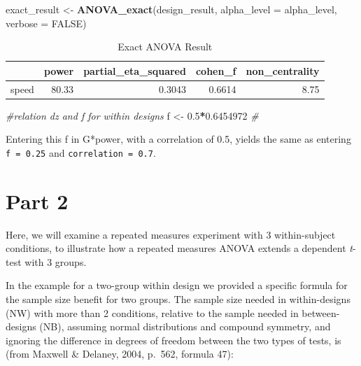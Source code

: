 \documentclass[]{book}
\newenvironment{Shaded}{\begin{snugshade}}{\end{snugshade}}
\newcommand{\CommentTok}[1]{\textcolor[rgb]{0.56,0.35,0.01}{\textit{#1}}}
\newcommand{\DataTypeTok}[1]{\textcolor[rgb]{0.13,0.29,0.53}{#1}}
\newcommand{\FloatTok}[1]{\textcolor[rgb]{0.00,0.00,0.81}{#1}}
\newcommand{\KeywordTok}[1]{\textcolor[rgb]{0.13,0.29,0.53}{\textbf{#1}}}
\newcommand{\NormalTok}[1]{#1}
\newcommand{\OperatorTok}[1]{\textcolor[rgb]{0.81,0.36,0.00}{\textbf{#1}}}
\newcommand{\OtherTok}[1]{\textcolor[rgb]{0.56,0.35,0.01}{#1}}
\newcommand{\StringTok}[1]{\textcolor[rgb]{0.31,0.60,0.02}{#1}}
\begin{document}
\begin{Shaded}
\begin{Highlighting}[]
\NormalTok{exact_result <-}\StringTok{ }\KeywordTok{ANOVA_exact}\NormalTok{(design_result,}
                            \DataTypeTok{alpha_level =}\NormalTok{ alpha_level,}
                            \DataTypeTok{verbose =} \OtherTok{FALSE}\NormalTok{)}
\end{Highlighting}
\end{Shaded}

\begin{table}[!h]

\caption{\label{tab:unnamed-chunk-105}Exact ANOVA Result}
\centering
\begin{tabular}{l|r|r|r|r}
\hline
  & power & partial\_eta\_squared & cohen\_f & non\_centrality\\
\hline
speed & 80.33 & 0.3043 & 0.6614 & 8.75\\
\hline
\end{tabular}
\end{table}

\begin{Shaded}
\begin{Highlighting}[]
\CommentTok{#relation dz and f for within designs }
\NormalTok{f <-}\StringTok{ }\FloatTok{0.5}\OperatorTok{*}\FloatTok{0.6454972}
\CommentTok{#  }
\end{Highlighting}
\end{Shaded}

Entering this f in G*power, with a correlation of 0.5, yields the same as entering \texttt{f\ =\ 0.25} and \texttt{correlation\ =\ 0.7}.

\hypertarget{part-2-1}{%
\section{Part 2}\label{part-2-1}}

Here, we will examine a repeated measures experiment with 3 within-subject conditions, to illustrate how a repeated measures ANOVA extends a dependent \emph{t}-test with 3 groups.

In the example for a two-group within design we provided a specific formula for the sample size benefit for two groups. The sample size needed in within-designs (NW) with more than 2 conditions, relative to the sample needed in between-designs (NB), assuming normal distributions and compound symmetry, and ignoring the difference in degrees of freedom between the two types of tests, is (from Maxwell \& Delaney, 2004, p.~562, formula 47):
\end{document}
